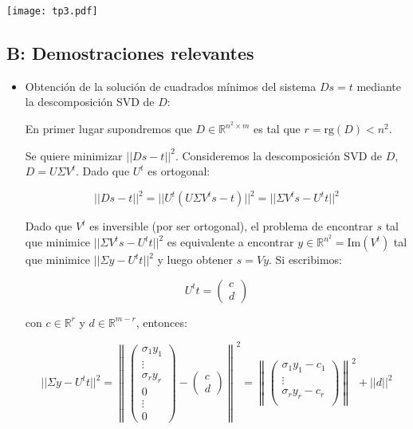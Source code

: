 \documentclass[a4paper]{article}
\begin{document}
\texttt{[image: tp3.pdf]}


\subsection*{B: Demostraciones relevantes}

\begin{itemize}

\item Obtención de la solución de cuadrados mínimos del sistema $Ds = t$ mediante la descomposición SVD de $D$:

En primer lugar supondremos que $D \in \mathbb{R}^{n^2 \times m}$ es tal que $r = \text{rg}(D) < n^2$.

Se quiere minimizar $||Ds - t||^2$. Consideremos la descomposición SVD de $D$, $D = U\Sigma V^t$. Dado que $U^t$ es ortogonal:

\[
||Ds - t||^2 = ||U^t(U\Sigma V^t s - t)||^2 = ||\Sigma V^t s - U^tt||^2
\]

Dado que $V^t$ es inversible (por ser ortogonal), el problema de encontrar $s$ tal que minimice $||\Sigma V^t s - U^tt||^2$ es equivalente 
a encontrar $y \in \mathbb{R}^{n^2} = \text{Im}(V^t)$ tal que minimice $||\Sigma y - U^tt||^2$ y luego obtener $s = Vy$. Si escribimos:

\[
U^tt = 
    \begin{pmatrix}
      c \\
      d
    \end{pmatrix}
\]

\noindent con $c \in \mathbb{R}^{r}$ y $d \in \mathbb{R}^{m - r}$, entonces:

\[
||\Sigma y - U^tt||^2 = 
\left\lVert
\begin{pmatrix}
      \sigma_1 y_1 \\
      \vdots \\
      \sigma_r y_r \\
      0 \\
      \vdots \\
      0
\end{pmatrix}
-
\begin{pmatrix}
      c \\
      d
\end{pmatrix}
\right\rVert^2
=
\left\lVert
\begin{pmatrix}
    \sigma_1 y_1 - c_1 \\
    \vdots \\
    \sigma_r y_r - c_r \\
\end{pmatrix}
\right\rVert^2
+ ||d||^2
\]


\end{itemize}
\end{document}
